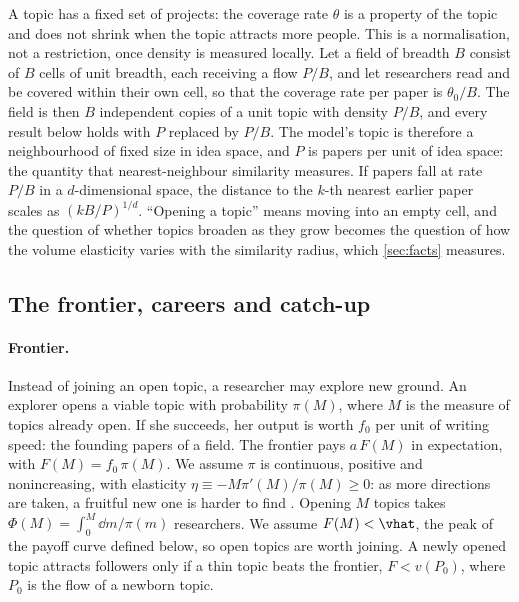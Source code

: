 \begin{remark}\label{rem:breadth}
A topic has a fixed set of projects: the coverage rate $\theta$ is a property
of the topic and does not shrink when the topic attracts more people. This is
a normalisation, not a restriction, once density is measured locally. Let a
field of breadth $B$ consist of $B$ cells of unit breadth, each receiving a
flow $P/B$, and let researchers read and be covered within their own cell, so
that the coverage rate per paper is $\theta_0/B$. The field is then $B$
independent copies of a unit topic with density $P/B$, and every result below
holds with $P$ replaced by $P/B$. The model's topic is therefore a
neighbourhood of fixed size in idea space, and $P$ is papers per unit of idea
space: the quantity that nearest-neighbour similarity measures. If papers fall
at rate $P/B$ in a $d$-dimensional space, the distance to the $k$-th nearest
earlier paper scales as $(kB/P)^{1/d}$. ``Opening a topic'' means moving into
an empty cell, and the question of whether topics broaden as they grow becomes
the question of how the volume elasticity varies with the similarity radius,
which \cref{sec:facts} measures.
\end{remark}

\subsection{The frontier, careers and catch-up}

\paragraph{Frontier.} Instead of joining an open topic, a researcher may explore
new ground. An explorer opens a viable topic with probability $\pi(M)$, where $M$
is the measure of topics already open. If she succeeds, her output is worth
$f_0$ per unit of writing speed: the founding papers of a field. The frontier
pays $a\,F(M)$ in expectation, with $F(M)=f_0\,\pi(M)$. We assume $\pi$ is
continuous, positive and nonincreasing, with elasticity
$\eta\equiv -M\pi'(M)/\pi(M)\ge 0$: as more directions are taken, a fruitful
new one is harder to find \citep{kortum1997,bloometal2020}. Opening $M$ topics
takes $\Phi(M)=\int_0^M \dd m/\pi(m)$ researchers. We assume $F(M)<\vhat$, the
peak of the payoff curve defined below, so open topics are worth joining. A
newly opened topic attracts followers only if a thin topic beats the frontier,
$F<v(P_0)$, where $P_0$ is the flow of a newborn topic.

